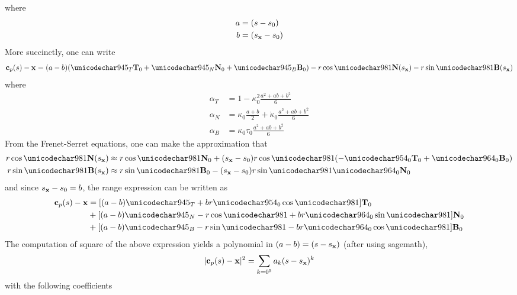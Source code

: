where
\begin{align}
 a &= (s-s_0)\\
 b &= (s_{\mathbf{x}} - s_0)
\end{align}
More succinctly, one can write
\begin{equation}
 \satp(\parm)-\vct\target = (a-b)(\alpha_T\vct{T}_0 + \alpha_N\vct{N}_0 + \alpha_B\vct{B}_0)- \targetrange\cos\targetdepression\vct{N}(\targetxparm) - \targetrange\sin\targetdepression\vct{B}(\targetxparm)
\end{equation}
where
\begin{align}
 \alpha_T &= 1 - \kappa^2_0\frac{a^2+ab+b^2}{6}\\
 \alpha_N &= \kappa_0\frac{a+b}{2} + \dot{\kappa}_0\frac{a^2+ab+b^2}{6}\\
 \alpha_B &= \kappa_0\tau_0\frac{a^2+ab+b^2}{6}
\end{align}
From the Frenet-Serret equations, one can make the approximation that
\begin{align}
 \targetrange\cos\targetdepression\vct{N}(\targetxparm)&\approx\targetrange\cos\targetdepression\vct{N}_0 + (\targetxparm-\parm_0)\targetrange\cos\targetdepression(-\kappa_0\vct{T}_0 + \tau_0\vct{B}_0)\\
 \targetrange\sin\targetdepression\vct{B}(\targetxparm)&\approx\targetrange\sin\targetdepression\vct{B}_0 - (\targetxparm-\parm_0)\targetrange\sin\targetdepression\tau_0\vct{N}_0
\end{align}
and since $s_{\mathbf{x}}-s_0 = b$, the range expression can be written as
\begin{equation}
\begin{split}
 \satp(\parm)-\vct\target &= [(a-b)\alpha_T + b\targetrange\kappa_0\cos\targetdepression]\vct{T}_0\\
 &+ [(a-b)\alpha_N - \targetrange\cos\targetdepression + b\targetrange\tau_0\sin\targetdepression]\vct{N}_0\\
 &+ [(a-b)\alpha_B- \targetrange\sin\targetdepression - b\targetrange\tau_0\cos\targetdepression]\vct{B}_0
 \end{split}
\end{equation}
The computation of square of the above expression yields a polynomial in $(a-b) = (s-s_{\mathbf{x}})$ (after using sagemath),
\begin{equation}
 \lvert\mathbf{c}_p(s)-\mathbf{\mathbf{x}}\rvert^2 = \sum_{k=0^5}a_k(s-s_{\mathbf{x}})^k
\end{equation}
with the following coefficients

